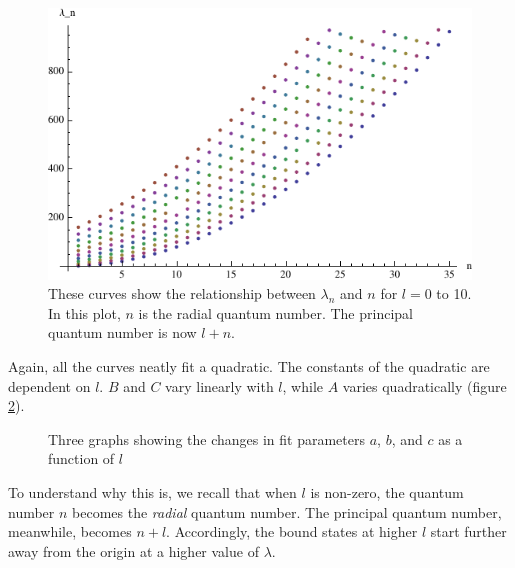 \documentclass[12pt,twoside]{reedthesis}
\begin{document}
\begin{figure}[h]
\centering
\includegraphics{Figures/allthelcs}
\caption[Plots of $\lambda_n$ versus $n$ for $l = 0$ to $10$]{These curves show the relationship between $\lambda_n$ and $n$ for $l = 0$ to 10. In this plot, $n$ is the radial quantum number. The principal quantum number is now $l + n$.}
\label{fig:allthelcs}
\end{figure}

Again, all the curves neatly fit a quadratic. The constants of the quadratic are dependent on $l$. $B$ and $C$ vary linearly with $l$, while $A$ varies quadratically (figure \ref{fig:parameters}). 
\begin{figure}[h]
\centering {}
\caption[Fit parameters for $l = 0$ to 10]{Three graphs showing the changes in fit parameters $a$, $b$, and $c$ as a function of $l$}
\label{fig:parameters}
\end{figure}
To understand why this is, we recall that when $l$ is non-zero, the quantum number $n$ becomes the \emph{radial} quantum number. The principal quantum number, meanwhile, becomes $n + l$. Accordingly, the bound states at higher $l$ start further away from the origin at a higher value of $\lambda$. 
\end{document}
